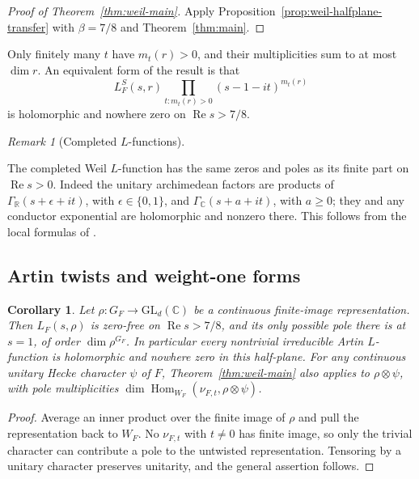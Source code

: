 \documentclass[11pt,a4paper]{article}
\numberwithin{equation}{section}
\newtheorem{corollary}[theorem]{Corollary}
\theoremstyle{definition}
\theoremstyle{remark}
\newtheorem{remark}[theorem]{Remark}
\newcommand{\RR}{\mathbb R}
\newcommand{\CC}{\mathbb C}
\newcommand{\Rea}{\operatorname{Re}}
\begin{document}
\begin{proof}[Proof of Theorem~\ref{thm:weil-main}]
Apply Proposition~\ref{prop:weil-halfplane-transfer} with
$\beta=7/8$ and Theorem~\ref{thm:main}.
\end{proof}

Only finitely many $t$ have $m_t(r)>0$, and their multiplicities
sum to at most $\dim r$.  An equivalent form of the result is that
\begin{equation}\label{eq:weil-regularized}
 L_F^S(s,r)\prod_{t:m_t(r)>0}(s-1-it)^{m_t(r)}
\end{equation}
is holomorphic and nowhere zero on $\Rea s>7/8$.

\begin{remark}[Completed $L$-functions]\label{rem:weil-actual-and-completed}

The completed Weil $L$-function has the same zeros and poles as its
finite part on $\Rea s>0$.  Indeed the unitary archimedean factors
are products of $\Gamma_{\RR}(s+\epsilon+it)$, with
$\epsilon\in\{0,1\}$, and $\Gamma_{\CC}(s+a+it)$, with
$a\geq0$; they and any conductor exponential are holomorphic and
nonzero there.  This follows from the local formulas of
\cite[Chapter~20]{Langlands}.  
\end{remark}

\subsection{Artin twists and weight-one forms}\label{subsec:Artin-applications}

\begin{corollary}\label{cor:Artin}
Let $\rho:G_F\longrightarrow\mathrm{GL}_d(\CC)$ be a continuous
finite-image representation.  Then $L_F(s,\rho)$ is zero-free on
$\Rea s>7/8$, and its only possible pole there is at $s=1$, of
order $\dim\rho^{G_F}$.  In particular every nontrivial irreducible
Artin $L$-function is holomorphic and nowhere zero in this half-plane.
For any continuous unitary Hecke character $\psi$ of $F$,
Theorem~\ref{thm:weil-main} also applies to $\rho\otimes\psi$,
with pole multiplicities
$\dim\operatorname{Hom}_{W_F}(\nu_{F,t},\rho\otimes\psi)$.
\end{corollary}
\begin{proof}
Average an inner product over the finite image of $\rho$ and pull
the representation back to $W_F$.  No $\nu_{F,t}$ with $t\ne0$
has finite image, so only the trivial character can contribute a
pole to the untwisted representation.  Tensoring by a unitary
character preserves unitarity, and the general assertion follows.
\end{proof}
\end{document}
